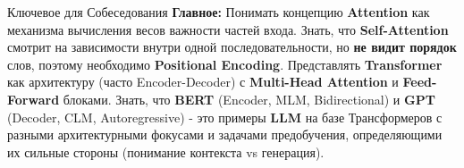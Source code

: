 \begin{alerttextbox}{Ключевое для Собеседования}
    \textbf{Главное:} Понимать концепцию \textbf{Attention} как механизма вычисления весов важности частей входа. Знать, что \textbf{Self-Attention} смотрит на зависимости внутри одной последовательности, но \textbf{не видит порядок} слов, поэтому необходимо \textbf{Positional Encoding}. Представлять \textbf{Transformer} как архитектуру (часто Encoder-Decoder) с \textbf{Multi-Head Attention} и \textbf{Feed-Forward} блоками. Знать, что \textbf{BERT} (Encoder, MLM, Bidirectional) и \textbf{GPT} (Decoder, CLM, Autoregressive) - это примеры \textbf{LLM} на базе Трансформеров с разными архитектурными фокусами и задачами предобучения, определяющими их сильные стороны (понимание контекста vs генерация).
\end{alerttextbox}

